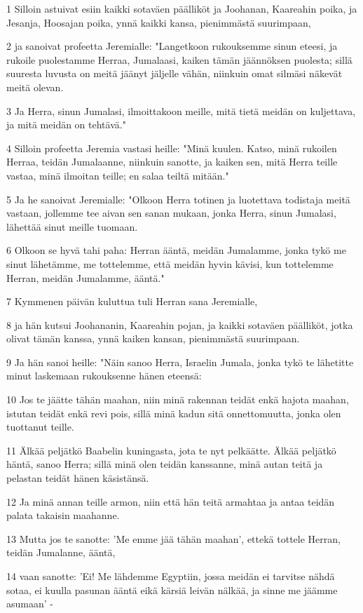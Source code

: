 \par 1 Silloin astuivat esiin kaikki sotaväen päälliköt ja Joohanan, Kaareahin poika, ja Jesanja, Hoosajan poika, ynnä kaikki kansa, pienimmästä suurimpaan,
\par 2 ja sanoivat profeetta Jeremialle: "Langetkoon rukouksemme sinun eteesi, ja rukoile puolestamme Herraa, Jumalaasi, kaiken tämän jäännöksen puolesta; sillä suuresta luvusta on meitä jäänyt jäljelle vähän, niinkuin omat silmäsi näkevät meitä olevan.
\par 3 Ja Herra, sinun Jumalasi, ilmoittakoon meille, mitä tietä meidän on kuljettava, ja mitä meidän on tehtävä."
\par 4 Silloin profeetta Jeremia vastasi heille: "Minä kuulen. Katso, minä rukoilen Herraa, teidän Jumalaanne, niinkuin sanotte, ja kaiken sen, mitä Herra teille vastaa, minä ilmoitan teille; en salaa teiltä mitään."
\par 5 Ja he sanoivat Jeremialle: "Olkoon Herra totinen ja luotettava todistaja meitä vastaan, jollemme tee aivan sen sanan mukaan, jonka Herra, sinun Jumalasi, lähettää sinut meille tuomaan.
\par 6 Olkoon se hyvä tahi paha: Herran ääntä, meidän Jumalamme, jonka tykö me sinut lähetämme, me tottelemme, että meidän hyvin kävisi, kun tottelemme Herran, meidän Jumalamme, ääntä."
\par 7 Kymmenen päivän kuluttua tuli Herran sana Jeremialle,
\par 8 ja hän kutsui Joohananin, Kaareahin pojan, ja kaikki sotaväen päälliköt, jotka olivat tämän kanssa, ynnä kaiken kansan, pienimmästä suurimpaan.
\par 9 Ja hän sanoi heille: "Näin sanoo Herra, Israelin Jumala, jonka tykö te lähetitte minut laskemaan rukouksenne hänen eteensä:
\par 10 Jos te jäätte tähän maahan, niin minä rakennan teidät enkä hajota maahan, istutan teidät enkä revi pois, sillä minä kadun sitä onnettomuutta, jonka olen tuottanut teille.
\par 11 Älkää peljätkö Baabelin kuningasta, jota te nyt pelkäätte. Älkää peljätkö häntä, sanoo Herra; sillä minä olen teidän kanssanne, minä autan teitä ja pelastan teidät hänen käsistänsä.
\par 12 Ja minä annan teille armon, niin että hän teitä armahtaa ja antaa teidän palata takaisin maahanne.
\par 13 Mutta jos te sanotte: 'Me emme jää tähän maahan', ettekä tottele Herran, teidän Jumalanne, ääntä,
\par 14 vaan sanotte: 'Ei! Me lähdemme Egyptiin, jossa meidän ei tarvitse nähdä sotaa, ei kuulla pasunan ääntä eikä kärsiä leivän nälkää, ja sinne me jäämme asumaan' -
